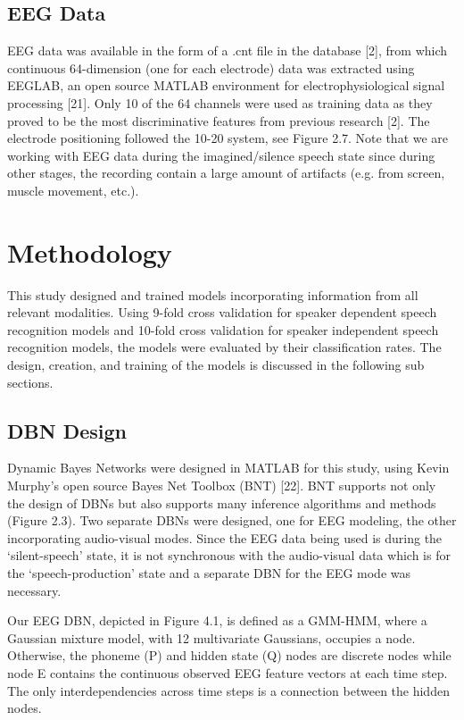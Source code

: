 \documentclass[11pt,letterpaper]{article}
\begin{document}
\subsection{EEG Data}
EEG data was available in the form of a .cnt file in the database [2], from which continuous 64-dimension (one for each electrode) data was extracted using EEGLAB, an open source MATLAB environment for electrophysiological signal processing [21].  Only 10 of the 64 channels were used as training data as they proved to be the most discriminative features from previous research [2]. The electrode positioning followed the 10-20 system, see Figure 2.7. Note that we are working with EEG data during the imagined/silence speech state since during other stages, the recording contain a large amount of artifacts (e.g. from screen, muscle movement, etc.).

\section{Methodology}
This study designed and trained models incorporating information from all relevant modalities. Using 9-fold cross validation for speaker dependent speech recognition models and 10-fold cross validation for speaker independent speech recognition models, the models were evaluated by their classification rates. The design, creation, and training of the models is discussed in the following sub sections. 

\subsection{DBN Design}
Dynamic Bayes Networks were designed in MATLAB for this study, using Kevin Murphy’s open source Bayes Net Toolbox (BNT) [22]. BNT supports not only the design of DBNs but also supports many inference algorithms and methods (Figure 2.3). Two separate DBNs were designed, one for EEG modeling, the other incorporating audio-visual modes. Since the EEG data being used is during the ‘silent-speech’ state, it is not synchronous with the audio-visual data which is for the ‘speech-production’ state and a separate DBN for the EEG mode was necessary.

Our EEG DBN, depicted in Figure 4.1, is defined as a GMM-HMM, where a Gaussian mixture model, with 12 multivariate Gaussians, occupies a node. Otherwise, the phoneme (P) and hidden state (Q) nodes are discrete nodes while node E contains the continuous observed EEG feature vectors at each time step. The only interdependencies across time steps is a connection between the hidden nodes.
\end{document}
